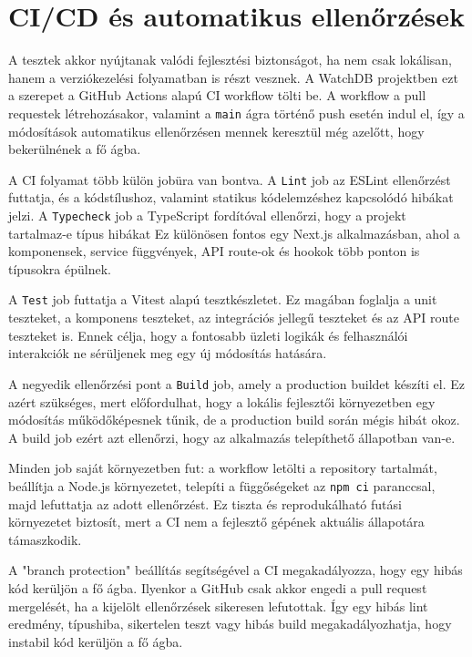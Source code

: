 \section{CI/CD és automatikus ellenőrzések}

A tesztek akkor nyújtanak valódi fejlesztési biztonságot, ha nem csak lokálisan, hanem a verziókezelési folyamatban is részt vesznek. A WatchDB projektben ezt a szerepet a GitHub Actions alapú CI workflow tölti be. A workflow a pull requestek létrehozásakor, valamint a \texttt{main} ágra történő push esetén indul el, így a módosítások automatikus ellenőrzésen mennek keresztül még azelőtt, hogy bekerülnének a fő ágba.

A CI folyamat több külön jobüra van bontva. A \texttt{Lint} job az ESLint ellenőrzést futtatja, és a kódstílushoz, valamint statikus kódelemzéshez kapcsolódó hibákat jelzi. A \texttt{Typecheck} job a TypeScript fordítóval ellenőrzi, hogy a projekt tartalmaz-e típus hibákat Ez különösen fontos egy Next.js alkalmazásban, ahol a komponensek, service függvények, API route-ok és hookok több ponton is típusokra épülnek.

A \texttt{Test} job futtatja a Vitest alapú tesztkészletet. Ez magában foglalja a unit teszteket, a komponens teszteket, az integrációs jellegű teszteket és az API route teszteket is. Ennek célja, hogy a fontosabb üzleti logikák és felhasználói interakciók ne sérüljenek meg egy új módosítás hatására.

A negyedik ellenőrzési pont a \texttt{Build} job, amely a production buildet készíti el. Ez azért szükséges, mert előfordulhat, hogy a lokális fejlesztői környezetben egy módosítás működőképesnek tűnik, de a production build során mégis hibát okoz. A build job ezért azt ellenőrzi, hogy az alkalmazás telepíthető állapotban van-e.

Minden job saját környezetben fut: a workflow letölti a repository tartalmát, beállítja a Node.js környezetet, telepíti a függőségeket az \texttt{npm ci} paranccsal, majd lefuttatja az adott ellenőrzést. Ez tiszta és reprodukálható futási környezetet biztosít, mert a CI nem a fejlesztő gépének aktuális állapotára támaszkodik.

A "branch protection" beállítás segítségével a CI megakadályozza, hogy egy hibás kód kerüljön a fő ágba. Ilyenkor a GitHub csak akkor engedi a pull request mergelését, ha a kijelölt ellenőrzések sikeresen lefutottak. Így egy hibás lint eredmény, típushiba, sikertelen teszt vagy hibás build megakadályozhatja, hogy instabil kód kerüljön a fő ágba.
